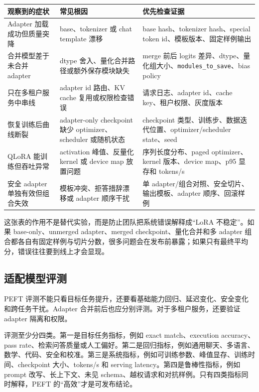 \documentclass[UTF8,zihao=-4,openany]{ctexbook}
\begin{document}
\begin{center}
\small
\begin{tabular}{@{}>{\raggedright\arraybackslash}p{}>{\raggedright\arraybackslash}p{}>{\raggedright\arraybackslash}p{}@{}}
\toprule
观察到的症状 & 常见根因 & 优先检查证据 \\
\midrule
Adapter 加载成功但质量突降 & base、tokenizer 或 chat template 漂移 & base hash、tokenizer hash、special token id、模板版本、固定样例输出 \\
合并模型差于未合并 adapter & dtype 舍入、量化合并路径或额外保存模块缺失 & merge 前后 logits 差异、dtype、量化组大小、\texttt{modules\_to\_save}、bias policy \\
只在多租户服务中串线 & adapter id 路由、KV cache 复用或权限检查错误 & 请求日志、adapter id、cache key、租户权限、灰度版本 \\
恢复训练后曲线断裂 & adapter-only checkpoint 缺少 optimizer、scheduler 或随机状态 & checkpoint 类型、训练步、数据迭代位置、optimizer/scheduler state、seed \\
QLoRA 能训练但吞吐异常 & activation 峰值、反量化 kernel 或 device map 放置问题 & 序列长度分布、paged optimizer、kernel 版本、device map、p95 显存和 tokens/s \\
安全 adapter 单独有效但组合失效 & 模板冲突、拒答措辞漂移或 adapter 顺序干扰 & 单 adapter/组合对照、安全切片、输出模板、adapter 顺序、回滚样例 \\
\bottomrule
\end{tabular}
\end{center}

这张表的作用不是替代实验，而是防止团队把系统错误解释成“LoRA 不稳定”。如果 base-only、unmerged adapter、merged checkpoint、量化合并和多 adapter 组合都各自有固定样例与切片分数，很多问题会在发布前暴露；如果只有最终平均分，错误往往要到线上才会显现。

\subsection{适配模型评测}
PEFT 评测不能只看目标任务提升，还要看基础能力回归、延迟变化、安全变化和跨任务干扰。Adapter 合并前后也应分别评测。对于多租户服务，还要验证 adapter 隔离和权限。

评测至少分四类。第一是目标任务指标，例如 exact match、execution accuracy、pass rate、检索问答质量或人工偏好。第二是回归指标，例如通用聊天、多语言、数学、代码、安全和校准。第三是系统指标，例如可训练参数、峰值显存、训练时间、checkpoint 大小、tokens/s 和 serving latency。第四是鲁棒性指标，例如 prompt 改写、长上下文、未见 schema、越权请求和对抗样例。只有四类指标同时解释，PEFT 的“高效”才是可发布结论。
\end{document}
